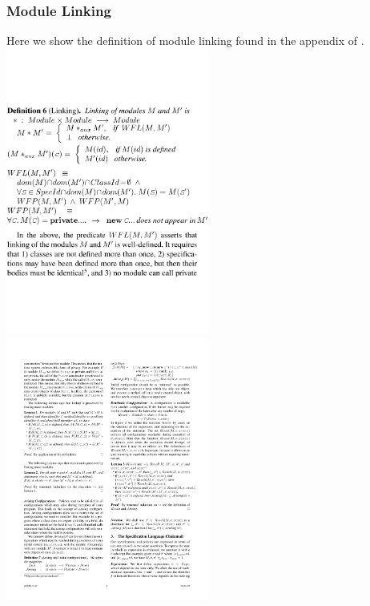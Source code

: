 \documentclass[a4paper,11pt,twoside]{article}
\begin{document}
{\subsubsection{Module Linking}\label{app:modulelinking}
Here we show the definition of module linking found in the appendix of \cite{drossopoulou2015b}.\\
\includegraphics[trim={0 5cm 0 5cm},width=0.5\textwidth,valign=t]{figures/app_modlink1.pdf}\linebreak
\includegraphics[width=0.5\textwidth,valign=t]{figures/app_modlink2.pdf}
\clearpage

}
\end{document}
